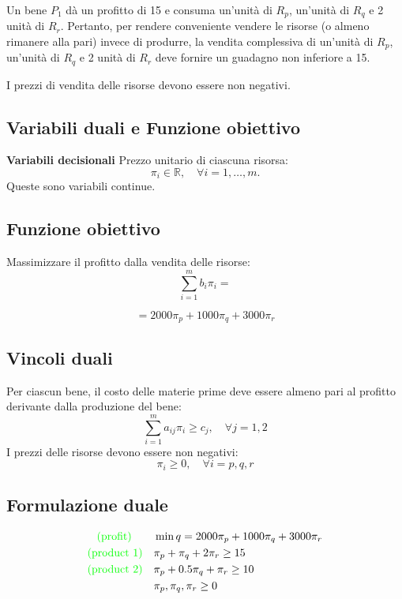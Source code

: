 \documentclass[a4paper, 11pt]{article}
\begin{document}
        \paragraph{}
        Un bene $P_1$ dà un profitto di 15 e consuma un'unità di $R_p$, un'unità di $R_q$ e 2 unità di $R_r$. Pertanto, per rendere conveniente vendere le risorse (o almeno rimanere alla pari) invece di produrre, la vendita complessiva di un'unità di $R_p$, un'unità di $R_q$ e 2 unità di $R_r$ deve fornire un guadagno non inferiore a 15.

        I prezzi di vendita delle risorse devono essere non negativi.

        \subsection*{Variabili duali e Funzione obiettivo}

            
            \textbf{Variabili decisionali}
            Prezzo unitario di ciascuna risorsa:
            \[ \pi_i \in \mathbb{R}, \quad \forall i = 1, \dots, m. \]
            Queste sono variabili continue.

        \subsection*{Funzione obiettivo}
            Massimizzare il profitto dalla vendita delle risorse:
            \[ 
                \sum_{i=1}^{m} b_i \pi_i = 
            \]

            \[
                = 2000 \pi_p + 1000 \pi_q + 3000 \pi_r
            \]

        \subsection*{Vincoli duali}
            Per ciascun bene, il costo delle materie prime deve essere almeno pari al profitto derivante dalla produzione del bene:
            \[ \sum_{i=1}^{m} a_{ij} \pi_i \geq c_j, \quad \forall j=1,2 \]
            I prezzi delle risorse devono essere non negativi:
            \[ \pi_i \geq 0, \quad \forall i=p,q,r \]

        \subsection*{Formulazione duale}

            \begin{align*}
                \textcolor{green}{\text{(profit)}} \quad \quad &\min q = 2000\pi_p + 1000\pi_q + 3000\pi_r \\
                \textcolor{green}{\text{(product 1)}} \quad & \pi_p + \pi_q + 2\pi_r \geq 15 \\
                \textcolor{green}{\text{(product 2)}} \quad & \pi_p + 0.5\pi_q + \pi_r \geq 10 \\
                & \pi_p, \pi_q, \pi_r \geq 0
            \end{align*}
            
\end{document}
